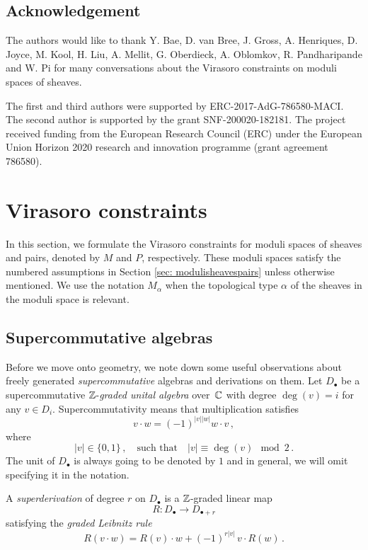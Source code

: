 \documentclass[a4paper, 12pt]{amsart}
\begin{document}
\subsection{Acknowledgement} 
The authors would like to thank Y. Bae, D. van Bree, J. Gross, A. Henriques, D. Joyce, M. Kool, H. Liu, A. Mellit,  G. Oberdieck, A. Oblomkov, R. Pandharipande and W. Pi for many conversations about the Virasoro constraints on moduli spaces of sheaves.

The first and third authors were supported by
ERC-2017-AdG-786580-MACI. The second author is supported by the grant SNF-200020-182181. The project received funding from the European Research Council (ERC) under the European Union Horizon 2020 research and innovation programme (grant agreement 786580).



\section{Virasoro constraints}
\label{sec: virasoro constraints}

In this section, we formulate the Virasoro constraints for moduli spaces of sheaves and pairs, denoted by $M$ and $P$, respectively. These moduli spaces satisfy the numbered assumptions in Section \ref{sec: modulisheavespairs} unless otherwise mentioned. We use the notation $M_\alpha$ when the topological type $\alpha$ of the sheaves in the moduli space is relevant. 

\subsection{Supercommutative algebras}
\label{sec: supercommutative}
Before we move onto geometry, we note down some useful observations about freely generated \textit{supercommutative} algebras and derivations on them. Let $D_\bullet$ be a supercommutative ${\mathbb{Z}}$-\textit{graded unital algebra} over~${\mathbb{C}}$ with degree $\deg(v) = i$ for any $v\in D_i$. Supercommutativity means that multiplication satisfies 
\[v\cdot w = (-1)^{|v||w|} w\cdot v\,,\]
where 
$$|v|\in \{0,1\}\,,\quad  \text{such that} \quad |v|\equiv \deg(v)\mod 2\,.$$
The unit of $D_\bullet$ is always going to be denoted by $1$ and in general, we will omit specifying it in the notation. 

A \textit{superderivation} of degree $r$ on $D_\bullet$ is a ${\mathbb{Z}}$-graded linear map 
$$
R:D_\bullet\longrightarrow D_{\bullet+r}
$$
satisfying the \textit{graded Leibnitz rule}
$$R(v\cdot w) = R(v)\cdot w + (-1)^{r|v|}\,v\cdot R(w)\,.$$
\end{document}
